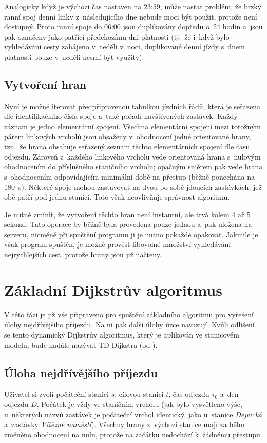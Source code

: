 Analogicky když je výchozí čas nastaven na 23:59, může nastat problém, že brzký ranní spoj denní linky z~následujícího dne nebude moci být použit, protože není dostupný. Proto ranní spoje do 06:00 jsou duplikovány dopředu o~24 hodin a~jsou pak označeny jako patřící předchozímu dni platnosti (tj.~že i~když bylo vyhledávání cesty zahájeno v~neděli v~noci, duplikované denní jízdy s~dnem platnosti pouze v~neděli nesmí být využity). 


\subsection{Vytvoření hran}
Nyní je možné iterovat předpřipravenou tabulkou jízdních řádů, která je seřazena dle identifikačního čísla spoje a~také pořadí navštívených zastávek. Každý záznam je jedno elementární spojení. Všechna elementární spojení mezi totožným párem linkových vrcholů jsou obsaženy v~ohodnocení jedné orientované hrany, tzn.~že hrana obsahuje seřazený seznam těchto elementárních spojení dle času odjezdu. Zároveň z~každého linkového vrcholu vede orientovaná hrana s~nulovým ohodnocením do příslušného staničního vrcholu; opačným směrem pak vede hrana s~ohodnocením odpovídajícím minimální době na přestup (běžně ponechána na 180~s). Některé spoje mohou zastavovat na dvou po sobě jdoucích zastávkách, jež obě patří pod jednu stanici. Toto však neovlivňuje správnost algoritmu.

Je nutné zmínit, že vytvoření těchto hran není instantní, ale trvá kolem 4 až 5 sekund. Tato operace by běžně byla provedena pouze jednou a~pak uložena na serveru, nicméně při  spuštění programu ji je nutno pokaždé opakovat. Jakmile je však program spuštěn, je možné provést libovolné množství vyhledávání nejrychlejších cest, protože hrany jsou již načteny.

\section{Základní Dijkstrův algoritmus}
V této fázi je již vše připraveno pro spuštění základního algoritmu pro vyřešení úlohy nejdřívějšího příjezdu. Na ni pak další úlohy úzce navazují. Kvůli odlišení se tento dynamický Dijkstrův algoritmus, který je aplikován ve stanicovém modelu, bude nadále nazývat TD-Dijkstra (od ).

\subsection{Úloha nejdřívějšího příjezdu}
Uživatel si zvolí počáteční stanici $s$, cílovou stanici $t$, čas odjezdu $\tau_0$ a~den odjezdu $D$. Počátek je vždy ve staničním vrcholu (jak bylo vysvětleno výše, u~některých názvů zastávek je počáteční vrchol identický, jako u~stanice \textit{Dejvická} a~zastávky \textit{Vítězné náměstí}). Všechny hrany z~výchozí stanice mají za běhu změněno ohodnocení na nulu, protože na začátku nedochází k~žádnému přestupu.

